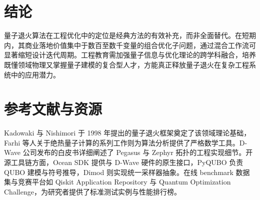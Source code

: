 \chapter{结论}
量子退火算法在工程优化中的定位是经典方法的有效补充，而非全面替代。在短期内，其商业落地价值集中于数百至数千变量的组合优化子问题，通过混合工作流可显著缩短设计迭代周期。工程教育需加强量子信息与优化理论的跨学科融合，培养既懂领域物理又掌握量子建模的复合型人才，方能真正释放量子退火在复杂工程系统中的应用潜力。\par
\chapter{参考文献与资源}
Kadowaki 与 Nishimori 于 1998 年提出的量子退火框架奠定了该领域理论基础，Farhi 等人关于绝热量子计算的系列工作则为算法分析提供了严格数学工具。D-Wave 公司发布的白皮书详细阐述了 Pegasus 与 Zephyr 拓扑的工程实现细节。开源工具链方面，Ocean SDK 提供与 D-Wave 硬件的原生接口，PyQUBO 负责 QUBO 建模与符号推导，Dimod 则实现统一采样器抽象。在线 benchmark 数据集与竞赛平台如 Qiskit Application Repository 与 Quantum Optimization Challenge，为研究者提供了标准测试实例与性能排行榜。\par
